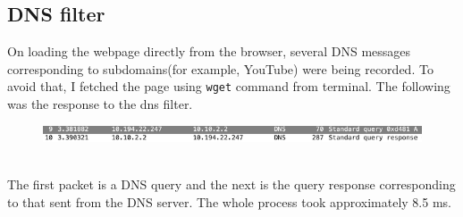 \documentclass[a4paper]{article}
\begin{document}
\subsection{DNS filter}
On loading the webpage directly from the browser, several DNS messages corresponding to subdomains(for example, YouTube) were being recorded. To avoid that, I fetched the page using \texttt{wget} command from terminal. The following was the response to the dns filter.
\begin{figure}[h]
\centering
\includegraphics{dns.png}
\\
\end{figure}\\
The first packet is a DNS query and the next is the query response corresponding to that sent from the DNS server. The whole process took approximately 8.5 ms. 
\end{document}
